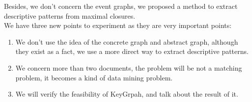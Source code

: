 Besides, we don't concern the event graphs, we proposed a method to extract descriptive patterns from maximal closures.\\
We have three new points to experiment as they are very important points:
\begin{enumerate}
\item We don't use the idea of the concrete graph and abstract graph, although they exist as a fact, we use a more direct way to extract descriptive patterns.
\item We concern more than two documents, the problem will be not a matching problem, it becomes a kind of data mining problem.
\item We will verify the feasibility of KeyGrpah, and talk about the result of it.
\end{enumerate}